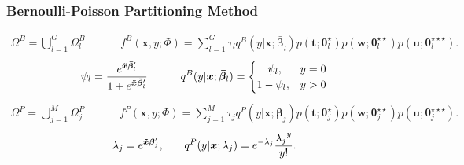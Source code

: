 \documentclass{beamer}
\begin{document}
\begin{frame}
\frametitle{Bernoulli-Poisson Partitioning Method}
\begin{small}

 \begin{align*}
\Omega^B =  \bigcup_{l =1}^G \Omega_l^B & & &  &
f^B(\bm x, y; \Phi)= \sum_{l=1}^{G} \tau_l q^B(y|\bm{x}; \bm{\bar{\beta}}_l) p(\bm{t};\bm{\theta}_l^{\star})p(\bm{w};\bm{\theta}_l^{\star\star})p(\bm{u};\bm{\theta}_l^{\star\star\star}).
\end{align*}
$$
 \psi_l =  \frac{e^{\bm{\tilde{x}} \bm{\bar{\beta}}_l'}}{1+ e^{\bm{\tilde{x}}  \bm{\bar{\beta}}_l'}}  \quad \quad \quad
 q^B(y | \bm{x} ;  \bm{\bar{\beta}}_l) = \begin{cases}
      \quad \psi_l, & y = 0\\
     1 -  \psi_l,  & y > 0
   \end{cases} 
$$
\begin{align*}
\Omega^P =  \bigcup_{j =1}^M \Omega_j^P & &  &  &
f^P(\bm x, y; \Phi)= \sum_{j=1}^{M} \tau_j q^P(y|\bm{x};\bm{\beta}_{j}) p(\bm{t};\bm{\theta}_j^{\star})p(\bm{w};\bm{\theta}_j^{\star\star})p(\bm{u};\bm{\theta}_j^{\star\star\star}).
\end{align*}
 \begin{align*}
\lambda_j = e^{\xTilda \bm{\beta}_j'}, & & & & %
q^P(y|\bm{ x} ; \lambda_{j} ) = e^{-\lambda_j} \frac{{\lambda_j}^y}{y!}.
 \end{align*}
\end{small}
\end{frame}
\end{document}
